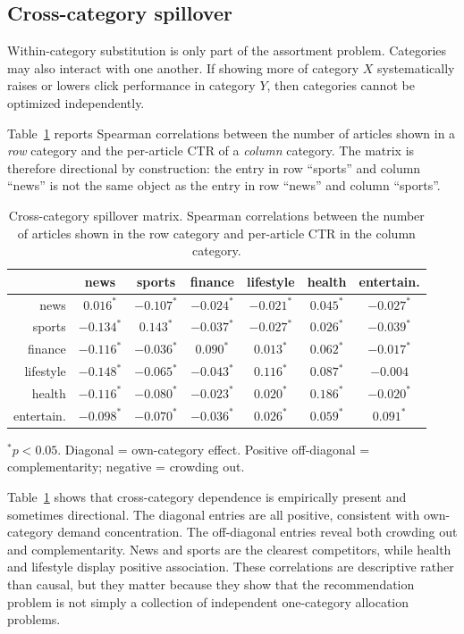 \documentclass[11pt]{article}
\begin{document}
\subsection{Cross-category spillover}

Within-category substitution is only part of the assortment problem. Categories may also interact with one another. If showing more of category $X$ systematically raises or lowers click performance in category $Y$, then categories cannot be optimized independently.

Table~\ref{tab:spillover} reports Spearman correlations between the number of articles shown in a \emph{row} category and the per-article CTR of a \emph{column} category. The matrix is therefore directional by construction: the entry in row ``sports'' and column ``news'' is not the same object as the entry in row ``news'' and column ``sports''.

\begin{table}[ht]
\centering
\caption{Cross-category spillover matrix. Spearman correlations between the number of articles shown in the row category and per-article CTR in the column category.}
\label{tab:spillover}
\small
\begin{tabular}{r|cccccc}
\toprule
& news & sports & finance & lifestyle & health & entertain. \\
\midrule
news & $0.016^*$ & $-0.107^*$ & $-0.024^*$ & $-0.021^*$ & $0.045^*$ & $-0.027^*$ \\
sports & $-0.134^*$ & $0.143^*$ & $-0.037^*$ & $-0.027^*$ & $0.026^*$ & $-0.039^*$ \\
finance & $-0.116^*$ & $-0.036^*$ & $0.090^*$ & $0.013^*$ & $0.062^*$ & $-0.017^*$ \\
lifestyle & $-0.148^*$ & $-0.065^*$ & $-0.043^*$ & $0.116^*$ & $0.087^*$ & $-0.004$ \\
health & $-0.116^*$ & $-0.080^*$ & $-0.023^*$ & $0.020^*$ & $0.186^*$ & $-0.020^*$ \\
entertain. & $-0.098^*$ & $-0.070^*$ & $-0.036^*$ & $0.026^*$ & $0.059^*$ & $0.091^*$ \\
\bottomrule
\end{tabular}

{\footnotesize $^*p < 0.05$. Diagonal = own-category effect. Positive off-diagonal = complementarity; negative = crowding out.}
\end{table}
\FloatBarrier

Table~\ref{tab:spillover} shows that cross-category dependence is empirically present and sometimes directional. The diagonal entries are all positive, consistent with own-category demand concentration. The off-diagonal entries reveal both crowding out and complementarity. News and sports are the clearest competitors, while health and lifestyle display positive association. These correlations are descriptive rather than causal, but they matter because they show that the recommendation problem is not simply a collection of independent one-category allocation problems.
\end{document}
